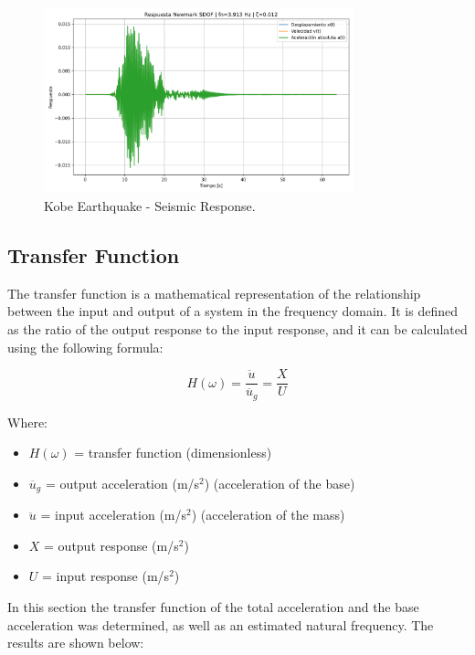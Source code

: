 \documentclass{article}  %
\begin{document}
\begin{figure}[H]
  \centering
  \includegraphics[width=0.8\textwidth]{GRAFICOS/respnewmark_Kobe.png}
  \caption{Kobe Earthquake - Seismic Response.}
  \label{fig:kobe}
\end{figure}

\subsection{Transfer Function}

The transfer function is a mathematical representation of the relationship between the input and output of a system in the frequency domain. It is defined as the ratio of the output response to the input response, and it can be calculated using the following formula:

\begin{equation}
  H(\omega) = \frac{\ddot{u}}{\ddot{u_g}} = \frac{X}{U}
\end{equation}

Where:
\begin{itemize}
  \item $H(\omega)$ = transfer function (dimensionless)
  \item $\ddot{u_g}$ = output acceleration (m/s$^2$) (acceleration of the base) 
  \item $\ddot{u}$ = input acceleration (m/s$^2$) (acceleration of the mass)
  \item $X$ = output response (m/s$^2$)
  \item $U$ = input response (m/s$^2$)
\end{itemize}

In this section the transfer function of the total acceleration and the base acceleration was determined, as well as an estimated natural frequency. The results are shown below:
\end{document}
